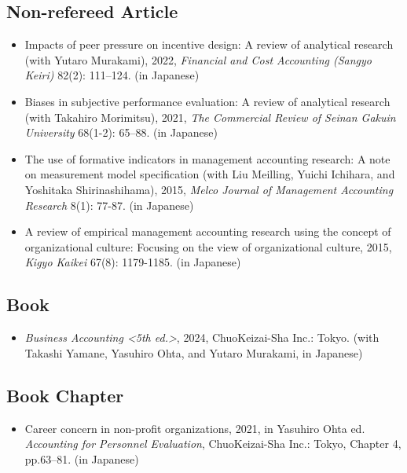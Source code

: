 \documentclass[letterpaper,11pt]{article}
\begin{document}
\subsection*{Non-refereed Article}

\begin{itemize}
    \item Impacts of peer pressure on incentive design: A review of analytical research (with Yutaro Murakami), 2022, \textit{Financial and Cost Accounting (Sangyo Keiri)} 82(2): 111--124. (in Japanese)

    \item Biases in subjective performance evaluation: A review of analytical research (with Takahiro Morimitsu), 2021, \textit{The Commercial Review of Seinan Gakuin University} 68(1-2): 65--88. (in Japanese)

	\item The use of formative indicators in management accounting research: A note on measurement model specification (with Liu Meilling, Yuichi Ichihara, and Yoshitaka Shirinashihama), 2015, \textit{Melco Journal of Management Accounting Research} 8(1): 77-87. (in Japanese)

	\item A review of empirical management accounting research using the concept of organizational culture: Focusing on the view of organizational culture, 2015, \textit{Kigyo Kaikei} 67(8): 1179-1185. (in Japanese)
\end{itemize}

\subsection*{Book}

\begin{itemize}
    \item \textit{Business Accounting <5th ed.>}, 2024, ChuoKeizai-Sha Inc.: Tokyo. (with Takashi Yamane, Yasuhiro Ohta, and Yutaro Murakami, in Japanese)
\end{itemize}

\subsection*{Book Chapter}

\begin{itemize}
	\item Career concern in non-profit organizations, 2021, in Yasuhiro Ohta ed. \textit{Accounting for Personnel Evaluation}, ChuoKeizai-Sha Inc.: Tokyo, Chapter 4, pp.63--81. (in Japanese)
\end{itemize}
\end{document}
